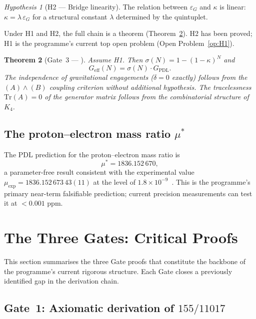 \documentclass[11pt,a4paper]{article}
\theoremstyle{plain}
\newtheorem{theorem}{Theorem}[section]
\theoremstyle{definition}
\theoremstyle{remark}
\newtheorem{hypothesis}[theorem]{Hypothesis}
\newcommand{\Kfour}{K_4}
\newcommand{\Geff}{G_{\mathrm{eff}}}
\newcommand{\GPDL}{G_{\mathrm{PDL}}}
\newcommand{\epsG}{\varepsilon_G}
\newcommand{\mustar}{\mu^*}
\begin{document}
\begin{hypothesis}[H2 — Bridge linearity]
The relation between $\epsG$ and $\kappa$ is linear: $\kappa = \lambda\,\epsG$ for a structural constant $\lambda$ determined by the quintuplet.
\end{hypothesis}

Under H1 and H2, the full chain is a theorem (Theorem~\ref{thm:Gate3}).
H2 has been proved; H1 is the programme's current top open problem (Open Problem~\ref{op:H1}).

\begin{theorem}[Gate~3 — \citep{D36}]
\label{thm:Gate3}
Assume H1.
Then $\sigma(N) = 1-(1-\kappa)^N$ and
\[
\Geff(N) = \sigma(N)\cdot\GPDL.
\]
The independence of gravitational engagements ($\delta=0$ exactly) follows from the $(A)\wedge(B)$ coupling criterion without additional hypothesis.
The tracelessness $\mathrm{Tr}(A)=0$ of the generator matrix follows from the combinatorial structure of $\Kfour$.
\end{theorem}

\subsection{The proton--electron mass ratio \texorpdfstring{$\mustar$}{mu*}}
\label{subsec:mu}

The PDL prediction for the proton--electron mass ratio is
\[
\mustar = 1836.152\,670,
\]
a parameter-free result consistent with the experimental value $\mu_{\exp}=1836.152\,673\,43(11)$ at the level of $1.8\times 10^{-9}$~\citep{D28,D29,D30}.
This is the programme's primary near-term falsifiable prediction; current precision measurements can test it at $<0.001$ ppm.

\section{The Three Gates: Critical Proofs}
\label{sec:gates}

This section summarises the three Gate proofs that constitute the backbone of the programme's current rigorous structure.
Each Gate closes a previously identified gap in the derivation chain.

\subsection{Gate~1: Axiomatic derivation of \texorpdfstring{$155/11017$}{155/11017}}
\label{subsec:gate1}
\end{document}
